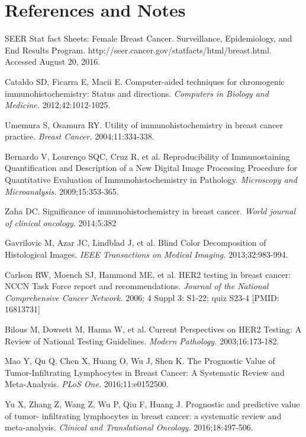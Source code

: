 \documentclass[12pt]{article}
\begin{document}
\newpage

\section*{References and Notes}

\noindent[1] SEER Stat fact Sheets: Female Breast Cancer. Surveillance, Epidemiology, and End Results
Program. http://seer.cancer.gov/statfacts/html/breast.html. Accessed August 20, 2016.

\noindent[2] Cataldo SD, Ficarra E, Macii E. Computer-aided techniques for chromogenic immunohistochemistry: Status and directions. \textit{Computers in Biology and Medicine.} 2012;42:1012-1025.

\noindent[3] Umemura S, Osamura RY. Utility of immunohistochemistry in breast cancer practice. \textit{Breast Cancer.} 2004;11:334-338.

\noindent[4] Bernardo V, Lourenço SQC, Cruz R, et al. Reproducibility of Immunostaining Quantification and Description of a New Digital Image Processing Procedure for Quantitative Evaluation of Immunohistochemistry in Pathology. \textit{Microscopy and Microanalysis.} 2009;15:353-365.

\noindent[5] Zaha DC. Significance of immunohistochemistry in breast cancer. \textit{World journal of clinical
oncology.} 2014;5:382

\noindent[6] Gavrilovic M, Azar JC, Lindblad J, et al. Blind Color Decomposition of Histological Images. \textit{IEEE
Transactions on Medical Imaging.} 2013;32:983-994.

\noindent[7] Carlson RW, Moench SJ, Hammond ME, et al. HER2 testing in breast cancer: NCCN Task Force report and recommendations. \textit{Journal of the National Comprehensive Cancer Network.} 2006; 4 Suppl 3: S1-22; quiz S23-4 [PMID: 16813731]

\noindent[8] Bilous M, Dowsett M, Hanna W, et al. Current Perspectives on HER2 Testing: A Review of National Testing Guidelines. \textit{Modern Pathology.} 2003;16:173-182.

\noindent[9] Mao Y, Qu Q, Chen X, Huang O, Wu J, Shen K. The Prognostic Value of Tumor-Infiltrating Lymphocytes in Breast Cancer: A Systematic Review and Meta-Analysis. \textit{PLoS One.} 2016;11:e0152500.

\noindent[10] Yu X, Zhang Z, Wang Z, Wu P, Qiu F, Huang J. Prognostic and predictive value of tumor- infiltrating lymphocytes in breast cancer: a systematic review and meta-analysis. \textit{Clinical and Translational Oncology.} 2016;18:497-506.
\end{document}
